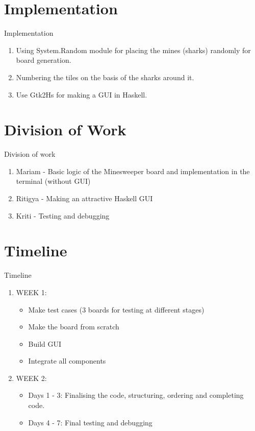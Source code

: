 \documentclass{beamer}
\begin{document}
\section{Implementation}
\begin{frame}{Implementation}
    \begin{enumerate}
        \item Using System.Random module for placing the mines (sharks) randomly for board generation.
        \item Numbering the tiles on the basis of the sharks around it.
        \item Use Gtk2Hs for making a GUI in Haskell.
    \end{enumerate}
    \end{frame}

\section{Division of Work}
\begin{frame}{Division of work}
    \begin{enumerate}
        \item Mariam - Basic logic of the Minesweeper board and implementation in the terminal (without GUI)
        \item Ritigya - Making an attractive Haskell GUI
        \item Kriti - Testing and debugging 
    \end{enumerate}
    \end{frame}

\section{Timeline}
\begin{frame}{Timeline}
    \begin{enumerate}
        \item WEEK 1: \begin{itemize}
            \item Make test cases (3 boards for testing at different stages)
            \item Make the board from scratch
            \item Build GUI
            \item Integrate all components
          \end{itemize}
        
        \item WEEK 2: \begin{itemize}
            \item Days 1 - 3: Finalising the code, structuring, ordering and completing code.
            \item Days 4 - 7: Final testing and debugging
          \end{itemize}
    \end{enumerate}
    \end{frame}
\end{document}
